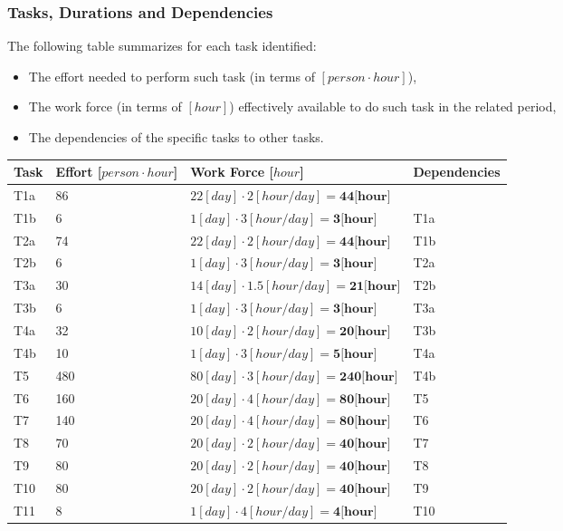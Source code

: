 \subsubsection{Tasks, Durations and Dependencies}
The following table summarizes for each task identified:
\begin{itemize}
	\item The effort needed to perform such task (in terms of $[person \cdot hour]$),
	\item The work force (in terms of $[hour]$) effectively available to do such task in the related period,
	\item The dependencies of the specific tasks to other tasks.
\end{itemize}
\begin{center}
	\begin{tabulary}{\linewidth\tymin=70pt}{Y{1cm}|Y{2.5cm}|Y{4cm}|Y{2.5cm}}
		\textbf{Task} & \textbf{Effort [$person \cdot hour$]} & \textbf{Work Force [$hour$]} & \textbf{Dependencies} \\ \hline
		T1a &  86 & $22[day] \cdot 2[hour/day] = \textbf{44[hour]}$  & \\ \hline
		T1b & 6 & $1[day] \cdot 3[hour/day] = \textbf{3[hour]}$ & T1a \\ \hline
		T2a & 74 & $22[day] \cdot 2[hour/day] = \textbf{44[hour]}$ & T1b \\ \hline
		T2b & 6 & $1[day] \cdot 3[hour/day] = \textbf{3[hour]}$ & T2a \\ \hline
		T3a & 30 & $14[day] \cdot 1.5[hour/day] = \textbf{21[hour]}$ & T2b \\ \hline
		T3b & 6 & $1[day] \cdot 3[hour/day] = \textbf{3[hour]}$ & T3a \\ \hline
		T4a & 32 & $10[day] \cdot 2[hour/day] = \textbf{20[hour]}$ & T3b \\ \hline
		T4b & 10 & $1[day] \cdot 3[hour/day] = \textbf{5[hour]}$ & T4a \\ \hline
		T5 & 480 & $80[day] \cdot 3[hour/day] = \textbf{240[hour]}$ & T4b \\ \hline
		T6 & 160 & $20[day] \cdot 4[hour/day] = \textbf{80[hour]}$ & T5 \\ \hline
		T7 & 140 & $20[day] \cdot 4[hour/day] = \textbf{80[hour]}$ & T6 \\ \hline
		T8 & 70 & $20[day] \cdot 2[hour/day] = \textbf{40[hour]}$ & T7 \\ \hline
		T9 & 80 & $20[day] \cdot 2[hour/day] = \textbf{40[hour]}$ & T8 \\ \hline
		T10 & 80 & $20[day] \cdot 2[hour/day] = \textbf{40[hour]}$ & T9 \\ \hline
		T11 & 8 & $1[day] \cdot 4[hour/day] = \textbf{4[hour]}$ & T10 \\
	\end{tabulary}
\end{center}
